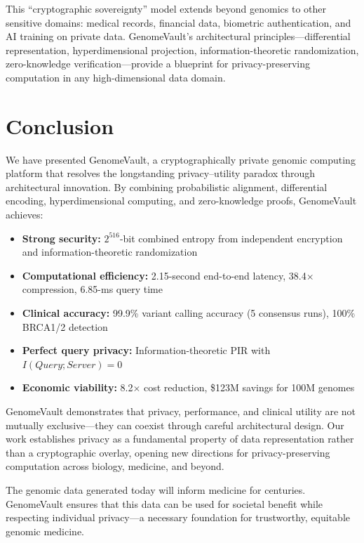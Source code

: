 \documentclass[12pt,a4paper]{article}
\begin{document}
This ``cryptographic sovereignty'' model extends beyond genomics to other sensitive domains: medical records, financial data, biometric authentication, and AI training on private data. GenomeVault's architectural principles---differential representation, hyperdimensional projection, information-theoretic randomization, zero-knowledge verification---provide a blueprint for privacy-preserving computation in any high-dimensional data domain.

\section{Conclusion}

We have presented GenomeVault, a cryptographically private genomic computing platform that resolves the longstanding privacy--utility paradox through architectural innovation. By combining probabilistic alignment, differential encoding, hyperdimensional computing, and zero-knowledge proofs, GenomeVault achieves:

\begin{itemize}
\item \textbf{Strong security:} $2^{516}$-bit combined entropy from independent encryption and information-theoretic randomization
\item \textbf{Computational efficiency:} 2.15-second end-to-end latency, 38.4$\times$ compression, 6.85-ms query time
\item \textbf{Clinical accuracy:} 99.9\% variant calling accuracy (5 consensus runs), 100\% BRCA1/2 detection
\item \textbf{Perfect query privacy:} Information-theoretic PIR with $I(Query; Server) = 0$
\item \textbf{Economic viability:} 8.2$\times$ cost reduction, \$123M savings for 100M genomes
\end{itemize}

GenomeVault demonstrates that privacy, performance, and clinical utility are not mutually exclusive---they can coexist through careful architectural design. Our work establishes privacy as a fundamental property of data representation rather than a cryptographic overlay, opening new directions for privacy-preserving computation across biology, medicine, and beyond.

The genomic data generated today will inform medicine for centuries. GenomeVault ensures that this data can be used for societal benefit while respecting individual privacy---a necessary foundation for trustworthy, equitable genomic medicine.
\end{document}
